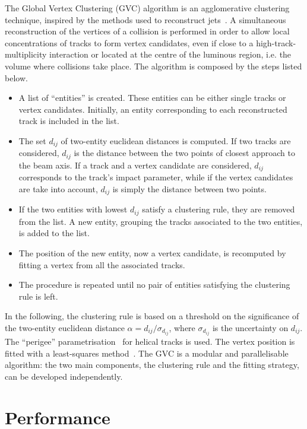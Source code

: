 \documentclass[a4paper,11pt]{article}
\begin{document}
The Global Vertex Clustering (GVC) algorithm is an agglomerative clustering technique, inspired by the methods used to reconstruct jets~\cite{Cacciari:2008}. A simultaneous reconstruction of the vertices of a collision is performed in order to allow local concentrations of tracks to form vertex candidates, even if close to a high-track-multiplicity interaction or located at the centre of the luminous region, i.e. the volume where collisions take place.
The algorithm is composed by the steps listed below.
\begin{itemize}
	\item A list of ``entities'' is created. These entities can be either single tracks or vertex candidates. Initially, an entity corresponding to each reconstructed track is included in the list.
	\item The set $d_{ij}$ of two-entity euclidean distances is computed. If two tracks are considered, $d_{ij}$ is the distance between the two points of closest approach to the beam axis. If a track and a vertex candidate are considered, $d_{ij}$ corresponds to the track's impact parameter, while if the vertex candidates are take into account, $d_{ij}$ is simply the distance between two points.
	\item If the two entities with lowest $d_{ij}$ satisfy a clustering rule, they are removed from the list. A new entity, grouping the tracks associated to the two entities, is added to the list. 
	\item The position of the new entity, now a vertex candidate, is recomputed by fitting a vertex from all the associated tracks.
	\item The procedure is repeated until no pair of entities satisfying the clustering rule is left.
\end{itemize}
In the following, the clustering rule is based on a threshold on the significance of the two-entity euclidean distance $\alpha = d_{ij}/\sigma_{d_{ij}}$, where $\sigma_{d_{ij}}$ is the uncertainty on $d_{ij}$. The ``perigee'' parametrisation~\cite{Billoir:1992yq} for helical tracks is used. The vertex position is fitted with a least-squares method~\cite{Piacquadio:2008zzb}. The GVC is a modular and parallelisable algorithm: the two main components, the clustering rule and the fitting strategy, can be developed independently.

\section{Performance}
\label{sec:performance}
\end{document}
